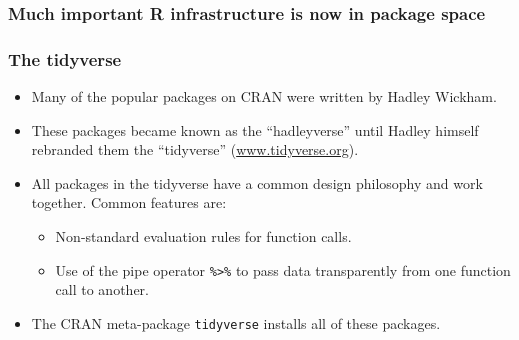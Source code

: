 \documentclass[svgnames]{beamer}
\begin{document}
\begin{frame}
  \frametitle{Much important R infrastructure is now in package space}

  \begin{center}
  \end{center}
    
\end{frame}

\begin{frame}[fragile]
  \frametitle{The tidyverse}
  
  \begin{itemize}
  \item Many of the popular packages on CRAN were written by Hadley Wickham.
  \item These packages became known as the ``hadleyverse'' until Hadley
    himself rebranded them the ``tidyverse'' (\url{www.tidyverse.org}).
  \item All packages in the tidyverse have a common design philosophy
    and work together. Common features are:
    \begin{itemize}
    \item Non-standard evaluation rules for function calls.
    \item Use of the pipe operator \verb+%>%+ to pass data
      transparently from one function call to another.
    \end{itemize}
  \item The CRAN meta-package \texttt{tidyverse} installs all of these
    packages.
  \end{itemize}
  
\end{frame}
\end{document}
